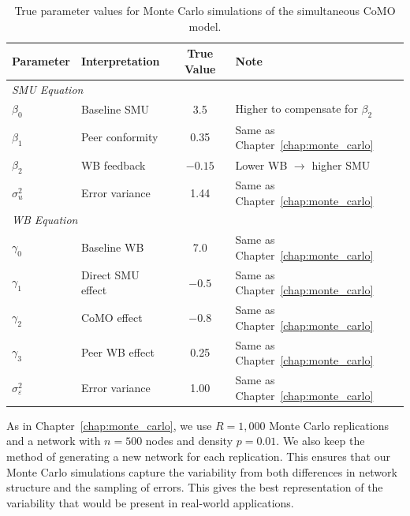 \begin{table}[htbp]
\centering
\caption[True parameter values for Monte Carlo simulations of the simultaneous CoMO model]{True parameter values for Monte Carlo simulations of the simultaneous CoMO model.}
\label{tab:mc_simul_params}
\small
\begin{tabular}{llcl}
\toprule
Parameter & Interpretation & True Value & Note \\
\midrule
\multicolumn{4}{l}{\textit{SMU Equation}} \\
$\beta_0$ & Baseline SMU & 3.5 & Higher to compensate for $\beta_2$ \\
$\beta_1$ & Peer conformity & 0.35 & Same as Chapter~\ref{chap:monte_carlo} \\
$\beta_2$ & WB feedback & $-0.15$ & Lower WB $\to$ higher SMU \\
$\sigma_u^2$ & Error variance & 1.44 & Same as Chapter~\ref{chap:monte_carlo} \\
\midrule
\multicolumn{4}{l}{\textit{WB Equation}} \\
$\gamma_0$ & Baseline WB & 7.0 & Same as Chapter~\ref{chap:monte_carlo} \\
$\gamma_1$ & Direct SMU effect & $-0.5$ & Same as Chapter~\ref{chap:monte_carlo} \\
$\gamma_2$ & CoMO effect & $-0.8$ & Same as Chapter~\ref{chap:monte_carlo} \\
$\gamma_3$ & Peer WB effect & 0.25 & Same as Chapter~\ref{chap:monte_carlo} \\
$\sigma_\varepsilon^2$ & Error variance & 1.00 & Same as Chapter~\ref{chap:monte_carlo} \\
\bottomrule
\end{tabular}
\end{table}

As in Chapter~\ref{chap:monte_carlo}, we use $R = 1{,}000$ Monte Carlo replications and a network with $n = 500$ nodes and density $p = 0.01$. We also keep the method of generating a new network for each replication. This ensures that our Monte Carlo simulations capture the variability from both differences in network structure and the sampling of errors. This gives the best representation of the variability that would be present in real-world applications.

